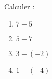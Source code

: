 
\begin{rituel}
    Calculer :
    \begin{multicols}{2}
        \begin{enumerate}
            \item
                \( 7-5\)
            \item
                \( 5-7\)
            \item
                \( 3+(-2)\)
            \item
                \( 1-(-4)\)
        \end{enumerate}
    \end{multicols}
\end{rituel}
